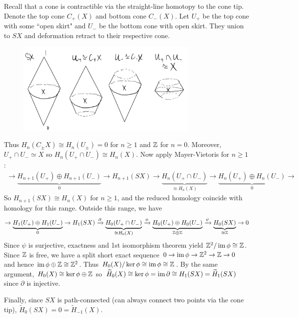 \documentclass[12pt]{article}
\begin{document}
\begin{problem}[8]
Recall that a cone is contractible via the straight-line homotopy to the cone tip. Denote the top cone $ C_+(X)$ and bottom cone  $ C_-(X)$. Let  $ U_+$ be the top cone with some ``open skirt" and $ U_-$ be the bottom cone with open skirt. They union to  $ SX$ and deformation retract to their respective cone.
~\begin{figure}[H]
	\centering
	\includegraphics[width=0.8\textwidth]{./figures/MV_suspension.png}
\end{figure}

Thus $ H_n(C_{\pm}X) \cong H_n(U_{\pm}) = 0$ for $ n \geq 1$ and  $ \mathbb{Z}$ for $ n=0$. Moreover,  $ U_+ \cap U_- \simeq X$ so $ H_n(U_+ \cap U_-) \cong H_n(X)$. Now apply Mayer-Vietoris for $ n \geq 1$:
\begin{align*}
	\to \underbrace{ H_{n+1}(U_+) \oplus H_{n+1}(U_-)}_{ 0} \to H_{n+1}(SX) \to \underbrace{ H_n(U_+ \cap U_-) }_{ \cong H_n(X)} \to \underbrace{ H_n(U_+) \oplus H_n(U_-)}_{ 0} \to
\end{align*}
So $ H_{n+1}(SX) \cong H_n(X)$ for $ n \geq 1$, and the reduced homology coincide with homology for this range. Outside this range, we have
\begin{align*}
	\to \underbrace{ H_{1}(U_+) \oplus H_{1}(U_-)}_{ 0} \to H_{1}(SX) \xrightarrow{ \partial }  \underbrace{ H_0(U_+ \cap U_-) }_{ \cong H_0(X)} \xrightarrow{ \phi}  \underbrace{ H_0(U_+) \oplus H_0(U_-)}_{ \mathbb{Z} \oplus \mathbb{Z}} \xrightarrow{ \psi}  \underbrace{ H_0(SX)}_{ \cong \mathbb{Z}}\to 0
\end{align*}
Since $ \psi$ is surjective, exactness and 1st isomorphism theorem yield $ \mathbb{Z}^2 / \operatorname{im} \phi \cong \mathbb{Z}$. Since $ \mathbb{Z}$ is free, we have a split short exact sequence $ 0 \to \operatorname{im} \phi \to \mathbb{Z}^2 \to \mathbb{Z} \to 0$ and hence $ \operatorname{im} \phi \oplus \mathbb{Z} \cong \mathbb{Z}^2$. Thus $ H_0(X) / \ker \phi \cong \operatorname{im} \phi \cong \mathbb{Z}$. By the same argument, $ H_0(X) \cong \ker \phi \oplus \mathbb{Z}$ so $ \widetilde{ H}_0(X) \cong \ker \phi = \operatorname{im} \partial \cong H_1(SX) = \widetilde{ H}_1(SX)$ since $ \partial $ is injective.

Finally, since $ SX$ is path-connected (can always connect two points via the cone tip),  $ \widetilde{ H}_0(SX) = 0 = \widetilde{ H}_{-1}(X)$.
\end{problem}
\end{document}
